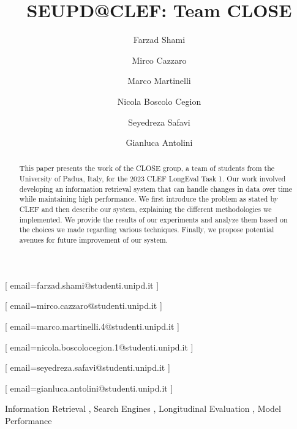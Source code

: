 \documentclass{ceurart}
\begin{document}


\title{SEUPD@CLEF: Team CLOSE}

\author[1]{Farzad Shami}[%
email=farzad.shami@studenti.unipd.it
]

\author[2]{Mirco Cazzaro}[%
email=mirco.cazzaro@studenti.unipd.it
]

\author[3]{Marco Martinelli}[%
email=marco.martinelli.4@studenti.unipd.it
]

\author[4]{Nicola Boscolo Cegion}[%
email=nicola.boscolocegion.1@studenti.unipd.it
]

\author[5]{Seyedreza Safavi}[%
email=seyedreza.safavi@studenti.unipd.it
]

\author[6]{Gianluca Antolini}[%
email=gianluca.antolini@studenti.unipd.it
]

\address[1]{University of Padua, Italy}


\begin{abstract}
  This paper presents the work of the CLOSE group, a team of students from the University of Padua, Italy, for the 2023 CLEF LongEval Task 1.
  Our work involved developing an information retrieval system that can handle changes in data over time while maintaining high performance.
  We first introduce the problem as stated by CLEF and then describe our system, explaining the different methodologies we implemented.
  We provide the results of our experiments and analyze them based on the choices we made regarding various techniques.
  Finally, we propose potential avenues for future improvement of our system.
\end{abstract}

\begin{keywords}
  Information Retrieval \sep
  Search Engines \sep
  Longitudinal Evaluation \sep
  Model Performance
\end{keywords}
\end{document}
